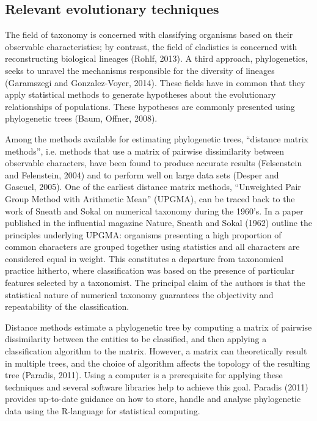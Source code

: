 \subsection{Relevant evolutionary techniques}
The field of taxonomy is concerned with classifying organisms based on their observable characteristics; by contrast, the field of cladistics is concerned with reconstructing biological lineages (Rohlf, 2013). A third approach, phylogenetics, seeks to unravel the mechanisms responsible for the diversity of lineages (Garamszegi and Gonzalez-Voyer, 2014). These fields have in common that they apply statistical methods to generate hypotheses about the evolutionary relationships of populations. These hypotheses are commonly presented using phylogenetic trees (Baum, Offner, 2008).

Among the methods available for estimating phylogenetic trees, “distance matrix methods”, i.e. methods that use a matrix of pairwise dissimilarity between observable characters, have been found to produce accurate results (Felsenstein and Felenstein, 2004) and to perform well on large data sets (Desper and Gascuel, 2005). One of the earliest distance matrix methods, “Unweighted Pair Group Method with Arithmetic Mean” (UPGMA), can be traced back to the work of Sneath and Sokal on numerical taxonomy during the 1960's. In a paper published in the influential magazine Nature, Sneath and Sokal (1962) outline the principles underlying UPGMA: organisms presenting a high proportion of common characters are grouped together using statistics and all characters are considered equal in weight. This constitutes a departure from taxonomical practice hitherto, where classification was based on the presence of particular features selected by a taxonomist. The principal claim of the authors is that the statistical nature of numerical taxonomy guarantees the objectivity and repeatability of the classification.

Distance methods estimate a phylogenetic tree by computing a matrix of pairwise dissimilarity between the entities to be classified, and then applying a classification algorithm to the matrix. However, a matrix can theoretically result in multiple trees, and the choice of algorithm affects the topology of the resulting tree (Paradis, 2011). Using a computer is a prerequisite for applying these techniques and several software libraries help to achieve this goal. Paradis (2011) provides up-to-date guidance on how to store, handle and analyse phylogenetic data using the R-language for statistical computing.

